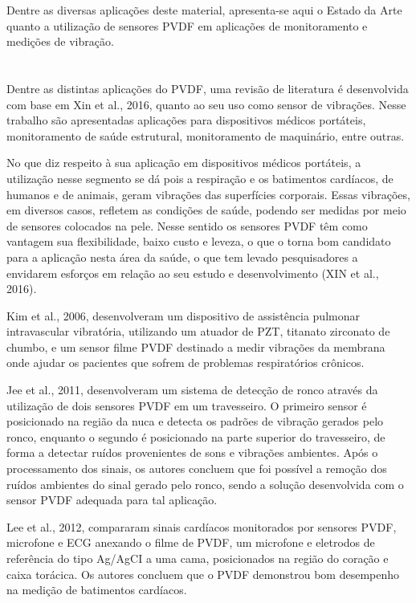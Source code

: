 \documentclass[
	12pt,				
	oneside,			
	a4paper,			
	english,			
	brazil,			
	]{abntex2ppgsi}
\begin{document}
Dentre as diversas aplicações deste material, apresenta-se aqui o Estado da Arte quanto a utilização de sensores PVDF em aplicações de monitoramento e medições de vibração.

\section{}

Dentre as distintas aplicações do PVDF, uma revisão de literatura é desenvolvida com base em Xin et al., 2016, quanto ao seu uso como sensor de vibrações. Nesse trabalho são apresentadas aplicações para dispositivos médicos portáteis, monitoramento de saúde estrutural, monitoramento de maquinário, entre outras.

No que diz respeito à sua aplicação em dispositivos médicos portáteis, a utilização nesse segmento se dá pois a respiração e os batimentos cardíacos, de humanos e de animais, geram vibrações das superfícies corporais. Essas vibrações, em diversos casos, refletem as condições de saúde, podendo ser medidas por meio de sensores colocados na pele. Nesse sentido os sensores PVDF têm como vantagem sua flexibilidade, baixo custo e leveza, o que o torna bom candidato para a aplicação nesta área da saúde, o que tem levado pesquisadores a envidarem esforços em relação ao seu estudo e desenvolvimento (XIN et al., 2016).

Kim et al., 2006, desenvolveram um dispositivo de assistência pulmonar intravascular vibratória, utilizando um atuador de PZT, titanato zirconato de chumbo, e um sensor filme PVDF destinado a medir vibrações da membrana onde ajudar os pacientes que sofrem de problemas respiratórios crônicos.

Jee et al., 2011, desenvolveram um sistema de detecção de ronco através da utilização de dois sensores PVDF em um travesseiro. O primeiro sensor é posicionado na região da nuca e detecta os padrões de vibração gerados pelo ronco, enquanto o segundo é posicionado na parte superior do travesseiro, de forma a detectar ruídos provenientes de sons e vibrações ambientes. Após o processamento dos sinais, os autores concluem que foi possível a remoção dos ruídos ambientes do sinal gerado pelo ronco, sendo a solução desenvolvida com o sensor PVDF adequada para tal aplicação.

Lee et al., 2012, compararam sinais cardíacos monitorados por sensores PVDF, microfone e ECG anexando o filme de PVDF, um microfone e eletrodos de referência do tipo Ag/AgCI a uma cama, posicionados na região do coração e caixa torácica. Os autores concluem que o PVDF demonstrou bom desempenho na medição de batimentos cardíacos. 
\end{document}
